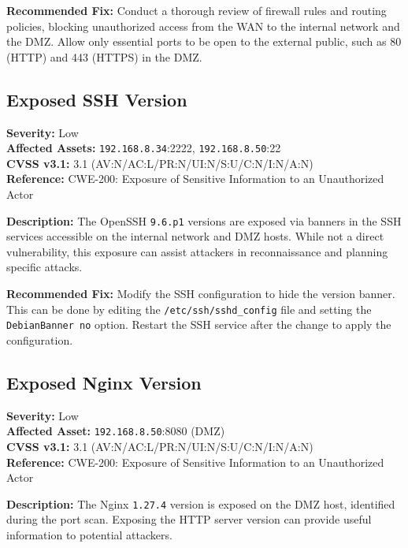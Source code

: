 \documentclass[a4paper,12pt]{article}
\begin{document}
\textbf{Recommended Fix:}  
Conduct a thorough review of firewall rules and routing policies, blocking unauthorized access from the WAN to the internal network and the DMZ. Allow only essential ports to be open to the external public, such as 80 (HTTP) and 443 (HTTPS) in the DMZ.

\vspace{1cm}

\subsection{Exposed SSH Version}
\textbf{Severity:} \textcolor{NavyBlue}{Low} \\
\textbf{Affected Assets:} \texttt{192.168.8.34}:2222, \texttt{192.168.8.50}:22 \\
\textbf{CVSS v3.1:} 3.1 (AV:N/AC:L/PR:N/UI:N/S:U/C:N/I:N/A:N) \\
\textbf{Reference:} CWE-200: Exposure of Sensitive Information to an Unauthorized Actor

\textbf{Description:}  
The OpenSSH \texttt{9.6.p1} versions are exposed via banners in the SSH services accessible on the internal network and DMZ hosts. While not a direct vulnerability, this exposure can assist attackers in reconnaissance and planning specific attacks.

\textbf{Recommended Fix:}  
Modify the SSH configuration to hide the version banner. This can be done by editing the \texttt{/etc/ssh/sshd\_config} file and setting the \texttt{DebianBanner no} option. Restart the SSH service after the change to apply the configuration.

\vspace{1cm}

\subsection{Exposed Nginx Version}
\textbf{Severity:} \textcolor{NavyBlue}{Low} \\
\textbf{Affected Asset:} \texttt{192.168.8.50}:8080 (DMZ) \\
\textbf{CVSS v3.1:} 3.1 (AV:N/AC:L/PR:N/UI:N/S:U/C:N/I:N/A:N) \\
\textbf{Reference:} CWE-200: Exposure of Sensitive Information to an Unauthorized Actor

\textbf{Description:}  
The Nginx \texttt{1.27.4} version is exposed on the DMZ host, identified during the port scan. Exposing the HTTP server version can provide useful information to potential attackers.
\end{document}
